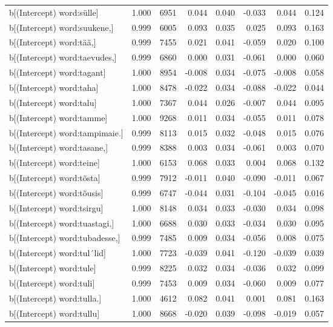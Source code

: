 \begin{longtable}{lrrrrrrr}
  b[(Intercept) word:sülle] & 1.000 & 6951 & 0.044 & 0.040 & -0.033 & 0.044 & 0.124 \\ 
  b[(Intercept) word:suukene,] & 0.999 & 6005 & 0.093 & 0.035 & 0.025 & 0.093 & 0.163 \\ 
  b[(Intercept) word:tää,] & 0.999 & 7455 & 0.021 & 0.041 & -0.059 & 0.020 & 0.100 \\ 
  b[(Intercept) word:taevudes,] & 0.999 & 6860 & 0.000 & 0.031 & -0.061 & 0.000 & 0.060 \\ 
  b[(Intercept) word:tagant] & 1.000 & 8954 & -0.008 & 0.034 & -0.075 & -0.008 & 0.058 \\ 
  b[(Intercept) word:taha] & 1.000 & 8478 & -0.022 & 0.034 & -0.088 & -0.022 & 0.044 \\ 
  b[(Intercept) word:talu] & 1.000 & 7367 & 0.044 & 0.026 & -0.007 & 0.044 & 0.095 \\ 
  b[(Intercept) word:tamme] & 1.000 & 9268 & 0.011 & 0.034 & -0.055 & 0.011 & 0.078 \\ 
  b[(Intercept) word:tampimaie.] & 0.999 & 8113 & 0.015 & 0.032 & -0.048 & 0.015 & 0.076 \\ 
  b[(Intercept) word:tasane,] & 0.999 & 8388 & 0.003 & 0.034 & -0.061 & 0.003 & 0.070 \\ 
  b[(Intercept) word:teine] & 1.000 & 6153 & 0.068 & 0.033 & 0.004 & 0.068 & 0.132 \\ 
  b[(Intercept) word:tõsta] & 0.999 & 7912 & -0.011 & 0.040 & -0.090 & -0.011 & 0.067 \\ 
  b[(Intercept) word:tõusis] & 0.999 & 6747 & -0.044 & 0.031 & -0.104 & -0.045 & 0.016 \\ 
  b[(Intercept) word:tsirgu] & 1.000 & 8148 & 0.034 & 0.033 & -0.030 & 0.034 & 0.098 \\ 
  b[(Intercept) word:tuastagi,] & 1.000 & 6688 & 0.030 & 0.033 & -0.034 & 0.030 & 0.095 \\ 
  b[(Intercept) word:tubadesse,] & 0.999 & 7485 & 0.009 & 0.034 & -0.056 & 0.008 & 0.075 \\ 
  b[(Intercept) word:tul´lid] & 1.000 & 7723 & -0.039 & 0.041 & -0.120 & -0.039 & 0.039 \\ 
  b[(Intercept) word:tule] & 0.999 & 8225 & 0.032 & 0.034 & -0.036 & 0.032 & 0.099 \\ 
  b[(Intercept) word:tuli] & 0.999 & 7453 & 0.009 & 0.034 & -0.060 & 0.009 & 0.077 \\ 
  b[(Intercept) word:tulla.] & 1.000 & 4612 & 0.082 & 0.041 & 0.001 & 0.081 & 0.163 \\ 
  b[(Intercept) word:tullu] & 1.000 & 8668 & -0.020 & 0.039 & -0.098 & -0.019 & 0.057 \\ 

\end{longtable}
